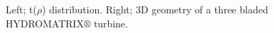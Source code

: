 

\begin{figure}[h!]
\begin{minipage}[b]{0.5\linewidth}
 \centering
\end{minipage}
\begin{minipage}[b]{0.5\linewidth}
 \centering
\end{minipage}
\caption{Left; t($\rho$) distribution. Right; 3D geometry of a three bladed HYDROMATRIX$\circledR$ turbine.}
\label{param10}
\end{figure}


